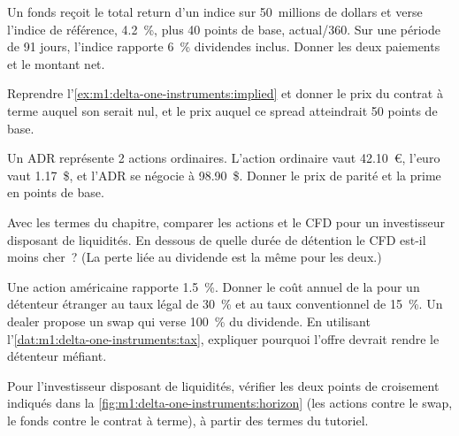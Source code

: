 \begin{exercise}[$\star$]\label{exo:m1:delta-one-instruments:1}
Un fonds reçoit le total return d'un indice sur 50~millions de dollars et verse
l'indice de référence, 4.2~\%, plus 40 points de base, actual/360. Sur une période de 91 jours,
l'indice rapporte 6~\% dividendes inclus. Donner les deux paiements et le montant net.
\end{exercise}

\begin{exercise}[$\star$]\label{exo:m1:delta-one-instruments:2}
Reprendre l'\cref{ex:m1:delta-one-instruments:implied} et donner le prix du
contrat à terme auquel son  serait nul, et le prix auquel
ce spread atteindrait 50 points de base.
\end{exercise}

\begin{exercise}[$\star$]\label{exo:m1:delta-one-instruments:3}
Un ADR représente 2 actions ordinaires. L'action ordinaire vaut 42.10~\euro, l'euro
vaut 1.17~\$, et l'ADR se négocie à 98.90~\$. Donner le prix de parité et la prime en
points de base.
\end{exercise}

\begin{exercise}[$\star\star$]\label{exo:m1:delta-one-instruments:4}
Avec les termes du chapitre, comparer les actions et le CFD pour un investisseur
disposant de liquidités. En dessous de quelle durée de détention le CFD est-il moins cher~? (La perte liée au dividende
est la même pour les deux.)
\end{exercise}

\begin{exercise}[$\star\star$]\label{exo:m1:delta-one-instruments:5}
Une action américaine rapporte 1.5~\%. Donner le coût annuel de la  pour
un détenteur étranger au taux légal de 30~\% et au taux conventionnel de 15~\%. Un dealer propose un
swap qui verse 100~\% du dividende. En utilisant
l'\cref{dat:m1:delta-one-instruments:tax}, expliquer pourquoi l'offre devrait rendre le
détenteur méfiant.
\end{exercise}

\begin{exercise}[$\star\star$]\label{exo:m1:delta-one-instruments:6}
Pour l'investisseur disposant de liquidités, vérifier les deux points de croisement indiqués dans
la \cref{fig:m1:delta-one-instruments:horizon} (les actions contre le swap, le fonds
contre le contrat à terme), à partir des termes du tutoriel.
\end{exercise}


